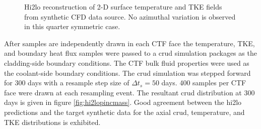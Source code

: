 \begin{figure}[H]%
    \captionsetup[subfigure]{justification=centering}
    \centering
    \hspace*{-3.1em}%
    \caption[Hi2lo reconstruction of 2-D surface temperature and TKE fields from synthetic CFD data source. ]{Hi2lo reconstruction of 2-D surface temperature and TKE fields from synthetic CFD data source. No azimuthal variation is observed in this quarter symmetric case. }%
    \label{fig:hi2lo_tke_t}%
\end{figure}


After samples are independently drawn in each CTF face the temperature, TKE, and boundary heat flux samples were passed to a crud simulation packages as the cladding-side boundary conditions.  The CTF bulk fluid properties were used as the coolant-side boundary conditions.  The crud simulation was stepped forward for 300 days with a resample step size of $\Delta t_s =50$ days.  400 samples per CTF face were drawn at each resampling event. The resultant crud distribution at 300 days is given in figure \ref{fig:hi2lopincmass}.  Good agreement between the hi2lo predictions and the target synthetic data for the axial crud, temperature, and TKE distributions is exhibited.

